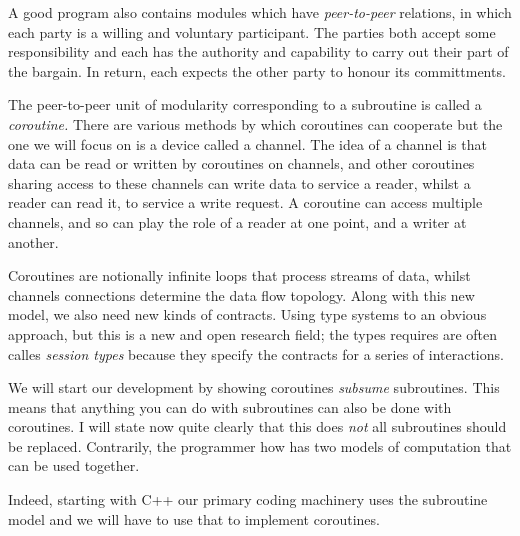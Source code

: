 \documentclass[oneside]{book}
\begin{document}
A good program also contains modules which have {\em peer-to-peer}
relations, in which each party is a willing and voluntary
participant. The parties both accept some responsibility and each
has the authority and capability to carry out their part of the
bargain. In return, each expects the other party to honour its
committments.

The peer-to-peer unit of modularity corresponding to a subroutine
is called a {\em coroutine.} There are various methods by which
coroutines can cooperate but the one we will focus on is a device
called a channel. The idea of a channel is that data can be read or
written by coroutines on channels, and other coroutines sharing
access to these channels can write data to service a reader,
whilst a reader can read it, to service a write request.
A coroutine can access multiple channels, and so can play the role
of a reader at one point, and a writer at another.

Coroutines are notionally infinite loops that process streams
of data, whilst channels connections determine the data flow
topology. Along with this new model, we also need new kinds of contracts.
Using type systems to an obvious approach, but this is a new and
open research field; the types requires are often calles
{\em session types} because they specify the contracts for
a series of interactions.

We will start our development by showing coroutines {\em subsume}
subroutines. This means that anything you can do with subroutines
can also be done with coroutines. I will state now quite clearly
that this does {\em not} all subroutines should be replaced.
Contrarily, the programmer how has two models of computation that
can be used together.

Indeed, starting with C++ our primary coding machinery uses the
subroutine model and we will have to use that to implement 
coroutines.
\end{document}

